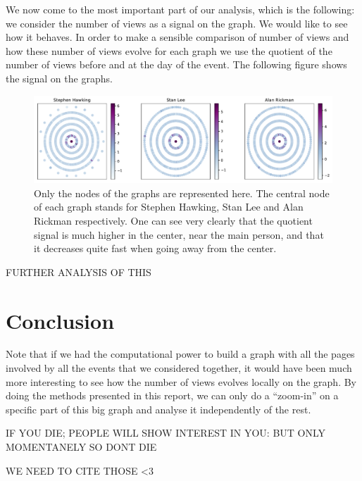 \documentclass[conference]{IEEEtran}
\begin{document}
We now come to the most important part of our analysis, which is the following: we consider the number of views as a signal on the graph. We would like to see how it behaves. In order to make a sensible comparison of number of views and how these number of views evolve for each graph we use the quotient of the number of views before and at the day of the event. 
The following figure shows the signal on the graphs. 
\begin{figure}[!htb]
  \includegraphics[width=\linewidth]{signal_scatter.pdf}
\caption{Only the nodes of the graphs are represented here. The central node of each graph stands for Stephen Hawking, Stan Lee and Alan Rickman respectively. One can see very clearly that the quotient signal is much higher in the center, near the main person, and that it decreases quite fast when going away from the center.}
\end{figure}

FURTHER ANALYSIS OF THIS

\section{Conclusion} \label{conclusion}

Note that if we had the computational power to build a graph with all the pages involved by all the events that we considered together, it would have been much more interesting to see how the number of views evolves locally on the graph. By doing the methods presented in this report, we can only do a “zoom-in” on a specific part of this big graph and analyse it independently of the rest. 

IF YOU DIE; PEOPLE WILL SHOW INTEREST IN YOU: BUT ONLY MOMENTANELY SO DONT DIE

WE NEED TO CITE THOSE <3

\cite{laplacian}  
\cite{signalprocessing}
\cite{clustering}



\end{document}
